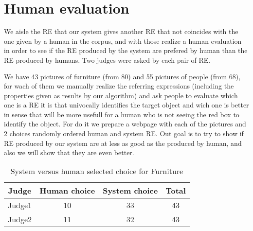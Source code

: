 \section{Human evaluation} \label{sec:evaluation}

We aisle the RE that our system gives another RE that not coincides with the one given by a human in the corpus, and with those realize a human evaluation in order to see if the RE produced by the system are prefered by human than the RE produced by humans. Two judges were asked by each pair of RE.

We have 43 pictures of furniture (from 80) and 55 pictures of people (from 68), for wach of them we manually realize the referring expressions (including the properties given as results by our algorithm) and ask people to evaluate which one is a RE it is that univocally identifies the target object and wich one is better in sense that will be more usefull for a human who is not seeing the red box to identify the object. For do it we prepare a webpage with each of the pictures and 2 choices randomly ordered human and system RE. Out goal is to try to show if RE produced by our system are at less as good as the produced by human, and also we will show that they are even better.



\begin{table}[h!]
\begin{center}
\begin{tabular}{|c|c|c|c|}
\hline
Judge    & Human choice & System choice & Total\\
\hline 
Judge1 & 10       & 33        & 43 \\
Judge2    & 11       & 32        & 43 \\
\hline
\end{tabular}
\caption{System versus human selected choice for Furniture} 
\label{system-versus-human-furniture}
\end{center}
\end{table}

